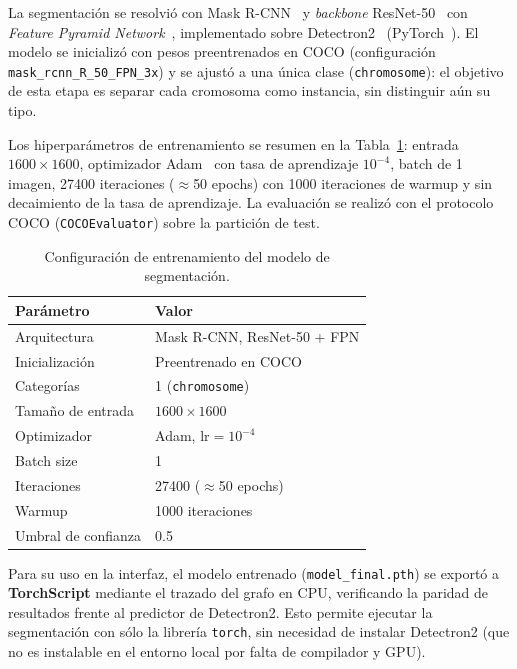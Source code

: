 \documentclass[11pt,a4paper]{article}
\begin{document}
La segmentación se resolvió con Mask R-CNN~\cite{he2017maskrcnn} y \textit{backbone}
ResNet-50~\cite{he2016resnet} con \textit{Feature Pyramid
Network}~\cite{lin2017fpn}, implementado sobre Detectron2~\cite{wu2019detectron2}
(PyTorch~\cite{paszke2019pytorch}). El modelo se inicializó con pesos preentrenados
en COCO (configuración \texttt{mask\_rcnn\_R\_50\_FPN\_3x}) y se ajustó a una única
clase (\texttt{chromosome}): el objetivo de esta etapa es separar cada
cromosoma como instancia, sin distinguir aún su tipo.

Los hiperparámetros de entrenamiento se resumen en la Tabla~\ref{tab:seg-config}:
entrada \(1600\times1600\), optimizador Adam~\cite{kingma2015adam} con tasa de
aprendizaje \(10^{-4}\), batch de 1 imagen, 27400 iteraciones (\(\approx\)50
epochs) con 1000 iteraciones de warmup y sin decaimiento de la tasa
de aprendizaje. La evaluación se realizó con el protocolo COCO
(\texttt{COCOEvaluator}) sobre la partición de test.

\begin{table}[H]
  \centering
  \small
  \caption{Configuración de entrenamiento del modelo de segmentación.}
  \label{tab:seg-config}
  \begin{tabular}{ll}
    \toprule
    Parámetro & Valor \\
    \midrule
    Arquitectura        & Mask R-CNN, ResNet-50 + FPN \\
    Inicialización      & Preentrenado en COCO \\
    Categorías          & 1 (\texttt{chromosome}) \\
    Tamaño de entrada   & \(1600 \times 1600\) \\
    Optimizador         & Adam, \(\text{lr}=10^{-4}\) \\
    Batch size          & 1 \\
    Iteraciones         & 27400 (\(\approx\)50 epochs) \\
    Warmup              & 1000 iteraciones \\
    Umbral de confianza & 0.5 \\
    \bottomrule
  \end{tabular}
\end{table}

Para su uso en la interfaz, el modelo entrenado (\texttt{model\_final.pth}) se
exportó a \textbf{TorchScript} mediante el trazado del grafo en CPU, verificando la
paridad de resultados frente al predictor de Detectron2. Esto permite ejecutar la
segmentación con sólo la librería \texttt{torch}, sin necesidad de instalar
Detectron2 (que no es instalable en el entorno local por falta de compilador y GPU).
\end{document}
